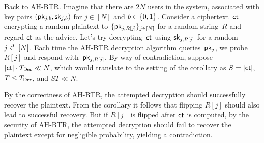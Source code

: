 Back to AH-BTR. Imagine that there are $2N$ users in the system, associated with key pairs $(\pk_{j,b},\sk_{j,b})$ for ${j\in[N]}$ and ${b\in{\{0,1\}}}$.
Consider a ciphertext~$\ct$ encrypting a random plaintext to $\{\pk_{j,R[j]}\}_{j\in[N]}$ for a random string~$R$ and
regard $\ct$ as the advice.
Let's try decrypting~$\ct$ using $\sk_{j,R[j]}$ for a random ${j\draws[N]}$.
Each time the AH-BTR decryption algorithm queries~$\pk_j$,
we probe $R[j]$ and respond with~$\pk_{j,R[j]}$.
By way of contradiction, suppose ${|\ct|\cdot\TDec\ll N}$,
which would translate to the setting of the corollary as ${S=|\ct|}$, ${T\leq\TDec}$, and ${ST\ll N}$.

By the correctness of AH-BTR,
the attempted decryption should successfully recover the plaintext.
From the corollary it follows that flipping $R[j]$ should also lead to successful recovery.
But if $R[j]$ is flipped after $\ct$ is computed,
by the security of AH-BTR,
the attempted decryption should fail to recover the plaintext except for negligible probability, yielding a contradiction.
